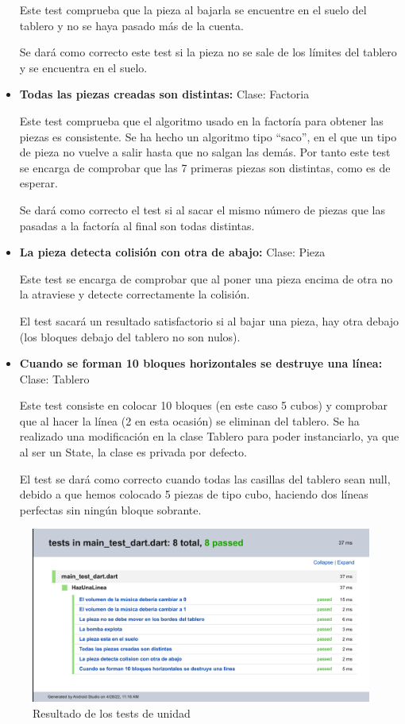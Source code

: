 \documentclass{article}
\begin{document}
\begin{itemize}
Este test comprueba que la pieza al bajarla se encuentre en el suelo del tablero y no se haya pasado más de la cuenta.

Se dará como correcto este test si la pieza no se sale de los límites del tablero y se encuentra en el suelo.

\item \textbf{Todas las piezas creadas son distintas:} Clase: Factoria

Este test comprueba que el algoritmo usado en la factoría para obtener las piezas es consistente. Se ha hecho un algoritmo tipo ``saco'', en el que un tipo de pieza no vuelve a salir hasta que no salgan las demás. Por tanto este test se encarga de comprobar que las 7 primeras piezas son distintas, como es de esperar.

Se dará como correcto el test si al sacar el mismo número de piezas que las pasadas a la factoría al final son todas distintas.

\item \textbf{La pieza detecta colisión con otra de abajo:} Clase: Pieza

Este test se encarga de comprobar que al poner una pieza encima de otra no la atraviese y detecte correctamente la colisión.

El test sacará un resultado satisfactorio si al bajar una pieza, hay otra debajo (los bloques debajo del tablero no son nulos).

\item \textbf{Cuando se forman 10 bloques horizontales se destruye una línea:} Clase: Tablero

Este test consiste en colocar 10 bloques (en este caso 5 cubos) y comprobar que al hacer la línea (2 en esta ocasión) se eliminan del tablero. Se ha realizado una modificación
en la clase Tablero para poder instanciarlo, ya que al ser un State, la clase es privada por defecto.

El test se dará como correcto cuando todas las casillas del tablero sean null, debido a que hemos colocado 5 piezas de tipo cubo, haciendo dos líneas perfectas sin ningún bloque sobrante.
\end{itemize}

\begin{figure}[H]
      \includegraphics[width=\textwidth]{imagenes/dart_test.png}
      \caption{Resultado de los tests de unidad}
\end{figure}
\end{document}
